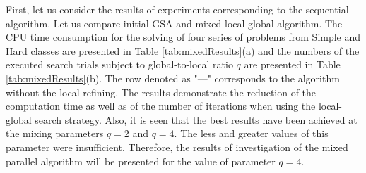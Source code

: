 \documentclass{aip-cp}
\begin{document}
First, let us consider the results of experiments corresponding to the sequential algorithm. Let us compare initial GSA and mixed local-global algorithm. The CPU time consumption for the solving of four series of problems from Simple and Hard classes are presented in Table \ref{tab:mixedResults}(a) and the numbers of the executed search trials subject to global-to-local ratio $q$ are presented in Table \ref{tab:mixedResults}(b). The row denoted as "---" corresponds to the algorithm without the local refining. The results demonstrate the reduction of the computation time as well as of the number of iterations when using the local-global search strategy. Also, it is seen that the best results have been achieved at the mixing parameters $q=2$ and $q=4$. The less and greater values of this parameter were insufficient. Therefore, the results of investigation of the mixed parallel algorithm will be presented for the value of parameter $q=4$.
\end{document}
